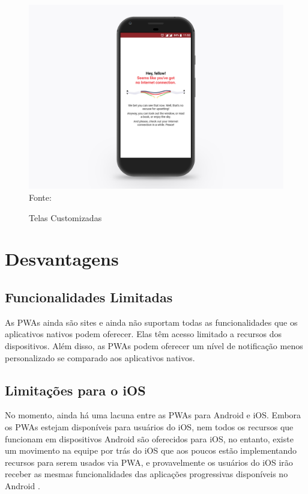\newpage
\begin{figure}[!htpb]
	\centering
	\caption{Telas Customizadas}
	\includegraphics[width=13cm]{images/pwa_custom.png}\\
	Fonte:\cite{pwabenefits}
 	\label{f_c4_pwa_custom}
\end{figure}

\section{Desvantagens}
\subsection{Funcionalidades Limitadas}
As \ac{PWA}s ainda são sites e ainda não suportam todas as funcionalidades que os aplicativos nativos podem oferecer. Elas têm acesso limitado a recursos dos dispositivos. Além disso, as \ac{PWA}s podem oferecer um nível de notificação menos personalizado se comparado aos aplicativos nativos.

\subsection{Limitações para o iOS}
No momento, ainda há uma lacuna entre as \ac{PWA}s para Android e iOS. Embora os PWAs estejam disponíveis para usuários do iOS, nem todos os recursos que funcionam em dispositivos Android são oferecidos para iOS, no entanto, existe um movimento na equipe por trás do iOS que aos poucos estão implementando recursos para serem usados via \ac{PWA}, e provavelmente os usuários do iOS irão receber as mesmas funcionalidades das aplicações progressivas disponíveis no Android \cite{pwaios}.